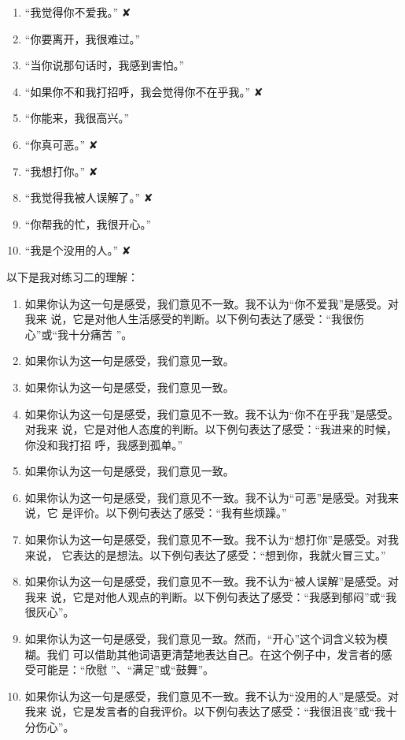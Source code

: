 \documentclass{ctexart}
\begin{document}
\begin{enumerate}
	\item ``我觉得你不爱我。'' ✘
	\item ``你要离开，我很难过。''
	\item ``当你说那句话时，我感到害怕。''
	\item ``如果你不和我打招呼，我会觉得你不在乎我。'' ✘
	\item ``你能来，我很高兴。''
	\item ``你真可恶。'' ✘
	\item ``我想打你。'' ✘
	\item ``我觉得我被人误解了。'' ✘
	\item ``你帮我的忙，我很开心。''
	\item ``我是个没用的人。'' ✘
\end{enumerate}

以下是我对练习二的理解：

\begin{enumerate}
	\item 如果你认为这一句是感受，我们意见不一致。我不认为``你不爱我''是感受。对我来
	      说，它是对他人生活感受的判断。以下例句表达了感受：``我很伤心''或``我十分痛苦
	      ''。
	\item 如果你认为这一句是感受，我们意见一致。
	\item 如果你认为这一句是感受，我们意见一致。
	\item 如果你认为这一句是感受，我们意见不一致。我不认为``你不在乎我''是感受。对我来
	      说，它是对他人态度的判断。以下例句表达了感受：``我进来的时候，你没和我打招
	      呼，我感到孤单。''
	\item 如果你认为这一句是感受，我们意见一致。
	\item 如果你认为这一句是感受，我们意见不一致。我不认为``可恶''是感受。对我来说，它
	      是评价。以下例句表达了感受：``我有些烦躁。''
	\item 如果你认为这一句是感受，我们意见不一致。我不认为``想打你''是感受。对我来说，
	      它表达的是想法。以下例句表达了感受：``想到你，我就火冒三丈。''
	\item 如果你认为这一句是感受，我们意见不一致。我不认为``被人误解''是感受。对我来
	      说，它是对他人观点的判断。以下例句表达了感受：``我感到郁闷''或``我很灰心''。
	\item 如果你认为这一句是感受，我们意见一致。然而，``开心''这个词含义较为模糊。我们
	      可以借助其他词语更清楚地表达自己。在这个例子中，发言者的感受可能是：``欣慰
	      ''、``满足''或``鼓舞''。
	\item 如果你认为这一句是感受，我们意见不一致。我不认为``没用的人''是感受。对我来
	      说，它是发言者的自我评价。以下例句表达了感受：``我很沮丧''或``我十分伤心''。
\end{enumerate}
\end{document}

